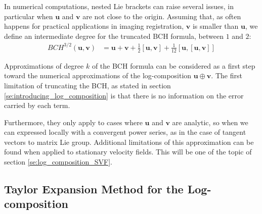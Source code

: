 In numerical computations, nested Lie brackets can raise several issues, in particular when $\mathbf{u}$ and $\mathbf{v}$ are not close to the origin. Assuming that, as often happens for practical applications in imaging registration, $\mathbf{v}$ is smaller than $\mathbf{u}$, we define an intermediate degree for the truncated BCH formula, between $1$ and $2$:
\begin{align*}
BCH^{3/2}(\mathbf{u},\mathbf{v}) &=  \mathbf{u} + \mathbf{v} + \frac{1}{2}[\mathbf{u},\mathbf{v}] + \frac{1}{12}[\mathbf{u},[\mathbf{u},\mathbf{v}]]
\end{align*}

Approximations of degree $k$ of the BCH formula can be considered as a first step toward the numerical approximations of the log-composition $\mathbf{u}\oplus \mathbf{v}$. 
The first limitation of truncating the BCH, as stated in section \ref{se:introducing_log_composition} is that there is no information on the error carried by each term. 

Furthermore, they only apply to cases where $\mathbf{u}$ and $\mathbf{v}$ are analytic, so when we can expressed locally with a convergent power series, as in the case of tangent vectors to matrix Lie group. Additional limitations of this approximation can be found when applied to stationary velocity fields. This will be one of the topic of section \ref{se:log_composition_SVF}.


\subsection{Taylor Expansion Method for the Log-composition}\label{se:taylor_expansion}

